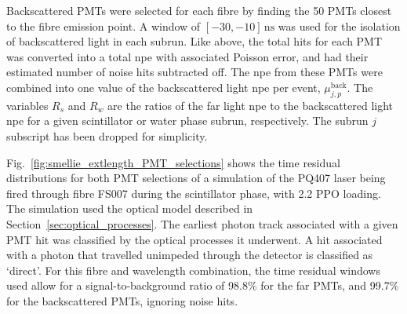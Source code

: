 Backscattered PMTs were selected for each fibre by finding the 50 PMTs closest to the fibre emission point. A \tres{} window of $[-30,-10]\,\si{\ns}$ was used for the isolation of backscattered light in each subrun. Like above, the total hits for each PMT was converted into a total npe with associated Poisson error, and had their estimated number of noise hits subtracted off. The npe from these PMTs were combined into one value of the backscattered light npe per event, $\mu_{j,p}^{\mathrm{back}}$. The variables $R_{s}$ and $R_{w}$ are the ratios of the far light npe to the backscattered light npe for a given scintillator or water phase subrun, respectively. The subrun $j$ subscript has been dropped for simplicity.

Fig.~\ref{fig:smellie_extlength_PMT_selections} shows the time residual distributions for both PMT selections of a simulation of the PQ407 laser being fired through fibre FS007 during the scintillator phase, with \SI{2.2}{\gpl} PPO loading. The simulation used the optical model described in Section~\ref{sec:optical_processes}. The earliest photon track associated with a given PMT hit was classified by the optical processes it underwent. A hit associated with a photon that travelled unimpeded through the detector is classified as `direct'. For this fibre and wavelength combination, the time residual windows used allow for a signal-to-background ratio of 98.8\% for the far PMTs, and 99.7\% for the backscattered PMTs, ignoring noise hits.

